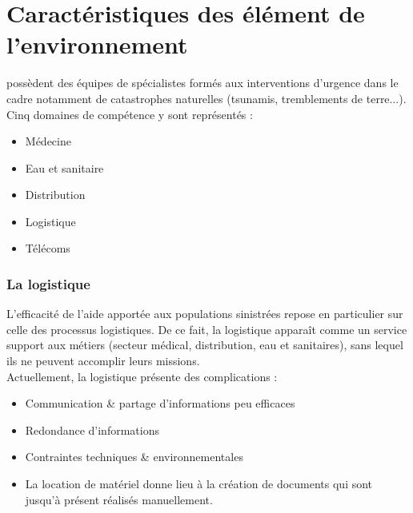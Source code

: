 \section{Caractéristiques des élément de l'environnement}
\mo possèdent des équipes de spécialistes formés aux interventions d'urgence dans le cadre notamment de catastrophes naturelles (tsunamis, tremblements de terre...).
Cinq domaines de compétence y sont représentés :
\begin{itemize}
\item Médecine
\item Eau et sanitaire
\item Distribution
\item Logistique
\item Télécoms
\end{itemize}
\subsubsection{La logistique}
L'efficacité de l'aide apportée aux populations sinistrées repose en particulier sur celle des processus logistiques. De ce fait, la logistique apparaît comme un service support aux métiers (secteur médical, distribution, eau et sanitaires), sans lequel ils ne peuvent accomplir leurs missions.
\\
Actuellement, la logistique présente des complications :
\begin{itemize}
\item Communication \& partage d'informations peu efficaces
\item Redondance d'informations
\item Contraintes techniques \& environnementales
\item La location de matériel donne lieu à la création de documents qui sont jusqu'à présent réalisés manuellement.
\end{itemize}

